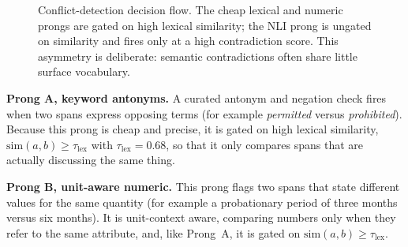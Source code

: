 \documentclass[conference]{IEEEtran}
\begin{document}
\begin{figure}[htbp]
\centering
{}
\caption{Conflict-detection decision flow. The cheap lexical and numeric
prongs are gated on high lexical similarity; the NLI prong is ungated on
similarity and fires only at a high contradiction score. This asymmetry is
deliberate: semantic contradictions often share little surface vocabulary.}
\label{fig:conflict}
\end{figure}

\textbf{Prong A, keyword antonyms.} A curated antonym and negation check
fires when two spans express opposing terms (for example
\textit{permitted} versus \textit{prohibited}). Because this prong is cheap
and precise, it is gated on high lexical similarity,
$\mathrm{sim}(a,b) \geq \tau_{\text{lex}}$ with $\tau_{\text{lex}} = 0.68$,
so that it only compares spans that are actually discussing the same thing.

\textbf{Prong B, unit-aware numeric.} This prong flags two spans that state
different values for the same quantity (for example a probationary period
of three months versus six months). It is unit-context aware, comparing
numbers only when they refer to the same attribute, and, like Prong~A, it
is gated on $\mathrm{sim}(a,b) \geq \tau_{\text{lex}}$.
\end{document}
